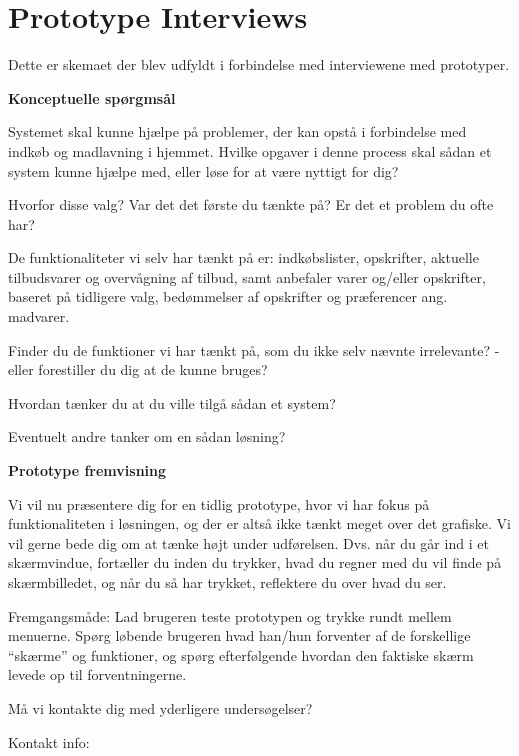 \chapter{Prototype Interviews}
Dette er skemaet der blev udfyldt i forbindelse med interviewene med prototyper.

\textbf{Konceptuelle spørgmsål}

Systemet skal kunne hjælpe på problemer, der kan opstå i forbindelse med indkøb og madlavning i hjemmet.
Hvilke opgaver i denne process skal sådan et system kunne hjælpe med, eller løse for at være nyttigt for dig?

Hvorfor disse valg? Var det det første du tænkte på? Er det et problem du ofte har?

De funktionaliteter vi selv har tænkt på er: indkøbslister, opskrifter, aktuelle tilbudsvarer og overvågning af tilbud, samt anbefaler varer og/eller opskrifter, baseret på tidligere valg, bedømmelser af opskrifter og præferencer ang. madvarer.

Finder du de funktioner vi har tænkt på, som du ikke selv nævnte irrelevante? - eller forestiller du dig at de kunne bruges?

Hvordan tænker du at du ville tilgå sådan et system?

Eventuelt andre tanker om en sådan løsning?

\textbf{Prototype fremvisning}

Vi vil nu præsentere dig for en tidlig prototype, hvor vi har fokus på funktionaliteten i løsningen, og der er altså ikke tænkt meget over det grafiske.
Vi vil gerne bede dig om at tænke højt under udførelsen. Dvs. når du går ind i et skærmvindue, fortæller du inden du trykker, hvad du regner med du vil finde på skærmbilledet, og når du så har trykket, reflektere du over hvad du ser.

Fremgangsmåde: Lad brugeren teste prototypen og trykke rundt mellem menuerne. Spørg løbende brugeren hvad han/hun forventer af de forskellige “skærme” og funktioner, og spørg efterfølgende hvordan den faktiske skærm levede op til forventningerne.  

Må vi kontakte dig med yderligere undersøgelser?

Kontakt info:

